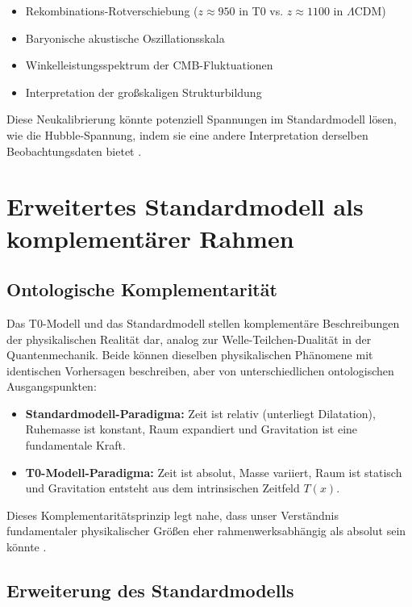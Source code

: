 \documentclass[12pt,a4paper]{article}
\newcommand{\Tfield}{T(x)}
\newcommand{\LCDM}{\Lambda\text{CDM}}
\begin{document}
	\begin{itemize}
		\item Rekombinations-Rotverschiebung (\(z \approx 950\) in T0 vs. \(z \approx 1100\) in \(\LCDM\))
		\item Baryonische akustische Oszillationsskala
		\item Winkelleistungsspektrum der CMB-Fluktuationen
		\item Interpretation der großskaligen Strukturbildung
	\end{itemize}
	
	Diese Neukalibrierung könnte potenziell Spannungen im Standardmodell lösen, wie die Hubble-Spannung, indem sie eine andere Interpretation derselben Beobachtungsdaten bietet \cite{DiValentino2021}.
	
	\section{Erweitertes Standardmodell als komplementärer Rahmen}
	\label{sec:extended_standard_model}
	
	\subsection{Ontologische Komplementarität}
	\label{subsec:ontological_complementarity}
	
	Das T0-Modell und das Standardmodell stellen komplementäre Beschreibungen der physikalischen Realität dar, analog zur Welle-Teilchen-Dualität in der Quantenmechanik. Beide können dieselben physikalischen Phänomene mit identischen Vorhersagen beschreiben, aber von unterschiedlichen ontologischen Ausgangspunkten:
	
	\begin{itemize}
		\item \textbf{Standardmodell-Paradigma:} Zeit ist relativ (unterliegt Dilatation), Ruhemasse ist konstant, Raum expandiert und Gravitation ist eine fundamentale Kraft.
		\item \textbf{T0-Modell-Paradigma:} Zeit ist absolut, Masse variiert, Raum ist statisch und Gravitation entsteht aus dem intrinsischen Zeitfeld \(\Tfield\).
	\end{itemize}
	
	Dieses Komplementaritätsprinzip legt nahe, dass unser Verständnis fundamentaler physikalischer Größen eher rahmenwerksabhängig als absolut sein könnte \cite{pascher_komplementaer_2025}.
	
	\subsection{Erweiterung des Standardmodells}
	\label{subsec:extending_standard_model}
	
\end{document}
